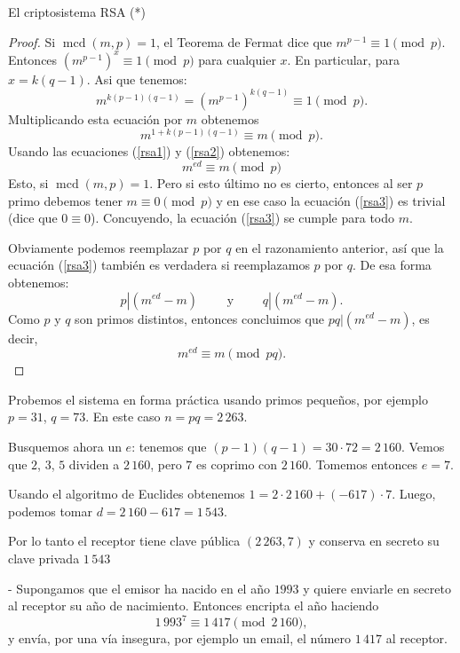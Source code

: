 \begin{section}{El criptosistema RSA (*)}
\begin{proof}
Si $\operatorname{mcd}(m, p) = 1$, el Teorema de Fermat dice que $m^{p - 1}  \equiv 1\pmod{p}$.
Entonces $(m^{p - 1})^x \equiv 1\pmod{p}$ para cualquier $x$. En particular, para 
$x = k(q-1)$. Asi que tenemos:
\begin{equation*}
m^{k(p-1)(q-1)} = (m^{p-1})^{k(q-1)} \equiv 1\pmod{p}.
\end{equation*}
Multiplicando esta ecuación por $m$ obtenemos
\begin{equation}\label{rsa2}
m^{1+k(p-1)(q-1)} \equiv m\pmod{p}. 
\end{equation}
Usando las ecuaciones (\ref{rsa1}) y (\ref{rsa2}) obtenemos:
\begin{equation}\label{rsa3}
m^{ed} \equiv m\pmod{p} 
\end{equation}
Esto, si  $\operatorname{mcd}(m, p) = 1$. Pero si esto último no es cierto, entonces al ser $p$
primo debemos tener $m \equiv 0\pmod{p}$ y en ese caso la ecuación (\ref{rsa3}) es trivial (dice que $0 \equiv 0$). Concuyendo, la ecuación (\ref{rsa3}) se cumple para todo $m$.

Obviamente podemos reemplazar $p$ por $q$ en el razonamiento anterior, así que la ecuación (\ref{rsa3}) también es verdadera si reemplazamos $p$ por $q$. De esa forma obtenemos:
$$p|(m^{ed}-m) \qquad \text{ y } \qquad q|(m^{ed}-m).$$
Como $p$ y $q$ son primos distintos, entonces concluimos que $pq|(m^{ed}-m)$, es decir, $$m^{ed} \equiv m \pmod{pq}.$$
\end{proof}

\begin{ejemplo*} Probemos el sistema en forma práctica usando primos pequeños, por ejemplo $p=31$, $q=73$. En este caso $n = pq = 2\,263$. 

Busquemos ahora un $e$:  tenemos que $ (p-1)(q-1)= 30\cdot 72 = 2\,160$. Vemos que $2$, $3$, $5$ dividen a $2\,160$, pero $7$ es coprimo con $2\,160$. 
Tomemos entonces $e = 7$.

Usando el algoritmo de Euclides obtenemos $1 = 2\cdot 2\,160 + (-617)\cdot 7$. Luego, podemos tomar $d = 2\,160 -617 =1\,543$. 

Por lo tanto el receptor tiene clave pública $(2\,263, 7)$ y conserva en secreto  su clave privada $1\,543$

- Supongamos que el emisor ha nacido en el año $1993$ y quiere enviarle en secreto al receptor su año de nacimiento. Entonces encripta el año haciendo 
$$
1\,993^7 \equiv 1\,417 \pmod{2\,160},
$$   
y envía, por una vía insegura, por ejemplo un email, el número $1\,417$ al receptor.


\end{ejemplo*}
\end{section}
